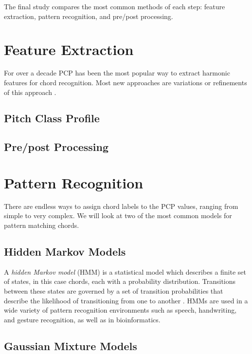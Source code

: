 \documentclass{sig-alternate}
\begin{document}
The final study \cite{TaeMin:2014} compares the most common methods of each step: feature extraction, pattern recognition, and pre/post processing.   


\section{Feature Extraction}

For over a decade PCP has been the most popular way to extract harmonic features for chord recognition. Most new approaches are variations or refinements of this approach \cite{TaeMin:2014}.

\subsection{Pitch Class Profile} 

\subsection{Pre/post Processing}


\section{Pattern Recognition}

There are endless ways to assign chord labels to the PCP values, ranging from simple to very complex. We will look at two of the most common models for pattern matching chords.

\subsection{Hidden Markov Models}\label{main} 

A \textit{hidden Markov model} (HMM) is a statistical model which describes a finite set of states, in this case chords, each with a probability distribution. Transitions between these states are governed by a set of transition probabilities that describe the likelihood of transitioning from one to another \cite{TaeMin:2014}. HMMs are used in a wide variety of pattern recognition environments such as speech, handwriting, and gesture recognition, as well as in bioinformatics. 


\subsection{Gaussian Mixture Models}
\end{document}
